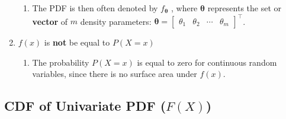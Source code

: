 \begin{enumerate}
\begin{enumerate}
        \item The PDF is then often denoted by $f_{\bm{\theta}}$ , where $\bm{\theta}$ represents the set or \textbf{vector} of $m$ density parameters:
        $\bm{\theta} =
        \begin{bmatrix}
            \theta_1 & \theta_2 & \cdots &\theta_m
        \end{bmatrix}
        ^\top
        $.
        \hfill \cite{statistics/book/Statistics-for-Data-Scientists/Maurits-Kaptein}
    \end{enumerate}

    \item  $f(x)$ is \textbf{not} be equal to $P(X = x)$
    \hfill \cite{statistics/book/Statistics-for-Data-Scientists/Maurits-Kaptein}
    \begin{enumerate}
        \item The probability $P(X = x)$ is equal to zero for continuous random variables, since there is no surface area under $f (x)$.
        \hfill \cite{statistics/book/Statistics-for-Data-Scientists/Maurits-Kaptein}
    \end{enumerate}
\end{enumerate}

\subsection{CDF of Univariate PDF ($F(X)$)}

